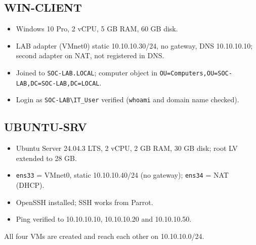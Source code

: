 \documentclass[11pt,a4paper]{article}
\begin{document}
\subsection{WIN-CLIENT}
\begin{itemize}
  \item Windows 10 Pro, 2 vCPU, 5 GB RAM, 60 GB disk.
  \item LAB adapter (VMnet0) static 10.10.10.30/24, no gateway, DNS
        10.10.10.10; second adapter on NAT, not registered in DNS.
  \item Joined to \texttt{SOC-LAB.LOCAL}; computer object in
        \texttt{OU=Computers,\allowbreak OU=SOC-LAB,\allowbreak DC=SOC-LAB,\allowbreak DC=LOCAL}.
  \item Login as \texttt{SOC-LAB\textbackslash IT\_User} verified
        (\texttt{whoami} and domain name checked).
\end{itemize}

\subsection{UBUNTU-SRV}
\begin{itemize}
  \item Ubuntu Server 24.04.3 LTS, 2 vCPU, 2 GB RAM, 30 GB disk; root LV
        extended to 28 GB.
  \item \texttt{ens33} = VMnet0, static 10.10.10.40/24 (no gateway);
        \texttt{ens34} = NAT (DHCP).
  \item OpenSSH installed; SSH works from Parrot.
  \item Ping verified to 10.10.10.10, 10.10.10.20 and 10.10.10.50.
\end{itemize}

All four VMs are created and reach each other on 10.10.10.0/24.
\end{document}

